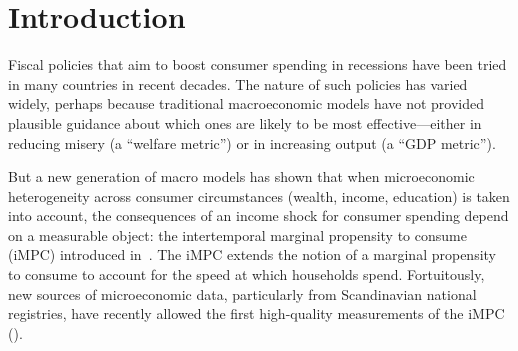 \documentclass[qe,draft]{econsocart}
\theoremstyle{plain}
\theoremstyle{definition}
\begin{document}


\begin{frontmatter}

  \MetadataApply

\end{frontmatter}




\section{Introduction}
\label{sec:intro} %
\setcounter{page}{0}

Fiscal policies that aim to boost consumer spending in recessions have been tried in many countries in recent decades.  The nature of such policies has varied widely, perhaps because traditional macroeconomic models have not provided plausible guidance about which ones are likely to be most effective---either in reducing misery (a ``welfare metric'') or in increasing output (a ``GDP metric'').

But a new generation of macro models has shown that when microeconomic heterogeneity across consumer circumstances (wealth, income, education) is taken into account, the consequences of an income shock for consumer spending depend on a measurable object: the intertemporal marginal propensity to consume (iMPC) introduced in~\cite{auclert2024IKC}.  The iMPC extends the notion of a marginal propensity to consume to account for the speed at which households spend.  Fortuitously, new sources of microeconomic data, particularly from Scandinavian national registries, have recently allowed the first high-quality measurements of the iMPC (\cite{fagereng-mpc-2021}).
\end{document}
